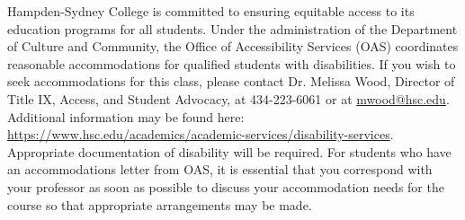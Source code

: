 \documentclass[10pt]{article}
\begin{document}
Hampden-Sydney College is committed to ensuring equitable access to its education programs for all students. Under the administration of the Department of Culture and Community, the Office of Accessibility Services (OAS) coordinates reasonable accommodations for qualified students with disabilities. If you wish to seek accommodations for this class, please contact Dr. Melissa Wood, Director of Title IX, Access, and Student Advocacy, at 434-223-6061 or at \url{mwood@hsc.edu}. Additional information may be found here: \url{https://www.hsc.edu/academics/academic-services/disability-services}. Appropriate documentation of disability will be required. For students who have an accommodations letter from OAS, it is essential that you correspond with your professor as soon as possible to discuss your accommodation needs for the course so that appropriate arrangements may be made. 
\end{document}
